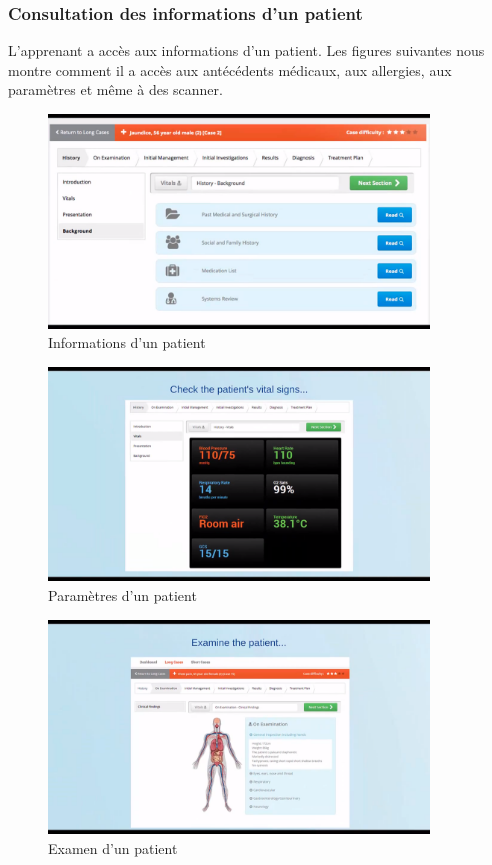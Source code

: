 \subsubsection{Consultation des informations d'un patient}
L'apprenant a accès aux informations d'un patient. Les figures suivantes nous montre comment il a accès aux antécédents médicaux, aux allergies, aux paramètres et même à des scanner.
\begin{figure}
    \centering
    \includegraphics[width=0.9\textwidth]{figures/met/infos patient.png}
    \captionsetup{justification=centering}
    \caption{Informations d'un patient}
\end{figure}

\begin{figure}
    \centering
    \includegraphics[width=0.9\textwidth]{figures/met/params.png}
    \captionsetup{justification=centering}
    \caption{Paramètres d'un patient}
\end{figure}

\begin{figure}
    \centering
    \includegraphics[width=0.9\textwidth]{figures/met/exam.png}
    \caption{Examen d'un patient}
    \captionsetup{justification=centering}
\end{figure}

